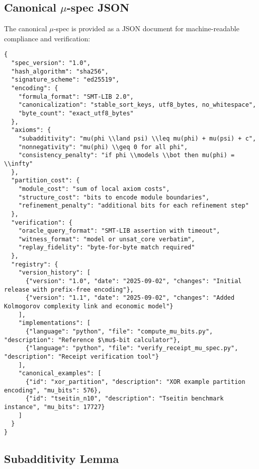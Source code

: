 \documentclass[11pt]{article}
\begin{document}
\subsection{Canonical $\mu$-spec JSON}

The canonical $\mu$-spec is provided as a JSON document for machine-readable compliance and verification:

\begin{verbatim}
{
  "spec_version": "1.0",
  "hash_algorithm": "sha256",
  "signature_scheme": "ed25519",
  "encoding": {
    "formula_format": "SMT-LIB 2.0",
    "canonicalization": "stable_sort_keys, utf8_bytes, no_whitespace",
    "byte_count": "exact_utf8_bytes"
  },
  "axioms": {
    "subadditivity": "mu(phi \\land psi) \\leq mu(phi) + mu(psi) + c",
    "nonnegativity": "mu(phi) \\geq 0 for all phi",
    "consistency_penalty": "if phi \\models \\bot then mu(phi) = \\infty"
  },
  "partition_cost": {
    "module_cost": "sum of local axiom costs",
    "structure_cost": "bits to encode module boundaries",
    "refinement_penalty": "additional bits for each refinement step"
  },
  "verification": {
    "oracle_query_format": "SMT-LIB assertion with timeout",
    "witness_format": "model or unsat_core verbatim",
    "replay_fidelity": "byte-for-byte match required"
  },
  "registry": {
    "version_history": [
      {"version": "1.0", "date": "2025-09-02", "changes": "Initial release with prefix-free encoding"},
      {"version": "1.1", "date": "2025-09-02", "changes": "Added Kolmogorov complexity link and economic model"}
    ],
    "implementations": [
      {"language": "python", "file": "compute_mu_bits.py", "description": "Reference $\mu$-bit calculator"},
      {"language": "python", "file": "verify_receipt_mu_spec.py", "description": "Receipt verification tool"}
    ],
    "canonical_examples": [
      {"id": "xor_partition", "description": "XOR example partition encoding", "mu_bits": 576},
      {"id": "tseitin_n10", "description": "Tseitin benchmark instance", "mu_bits": 17727}
    ]
  }
}
\end{verbatim}

\subsection{Subadditivity Lemma}
\end{document}
